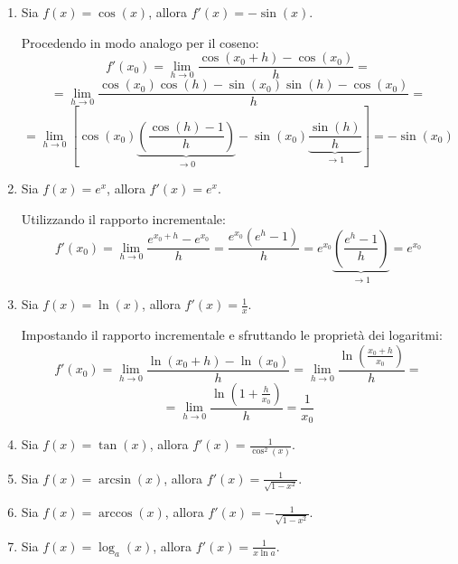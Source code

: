 \documentclass[12pt]{report}
\begin{document}
\begin{enumerate}
\begin{dimostrazione}{Derivata del seno}{}
		\end{dimostrazione}
		
		\item Sia $f(x) = \cos(x)$, allora $f'(x) = -\sin(x)$.
		\begin{dimostrazione}{}{}
			
			Procedendo in modo analogo per il coseno:
			\[
			f'(x_0) = \lim_{h \to 0} \frac{\cos(x_0 + h) - \cos(x_0)}{h} =
			\]
			\[
			= \lim_{h \to 0} \frac{\cos(x_0)\cos(h) - \sin(x_0)\sin(h) - \cos(x_0)}{h} =
			\]
			\[
			= \lim_{h \to 0} \left[ \cos(x_0) \underbrace{\left(\frac{\cos(h) - 1}{h}\right)}_{\to 0} - \sin(x_0) \underbrace{\frac{\sin(h)}{h}}_{\to 1} \right] = -\sin(x_0)
			\]
			
		\end{dimostrazione}
		
		\item Sia $f(x) = e^x$, allora $f'(x) = e^x$.
		\begin{dimostrazione}{}{}
			
			Utilizzando il rapporto incrementale:
			\[
			f'(x_0) = \lim_{h \to 0} \frac{e^{x_0 + h} - e^{x_0}}{h} = \frac{e^{x_0}(e^h - 1)}{h} = e^{x_0} \underbrace{\left(\frac{e^h - 1}{h}\right)}_{\to 1} = e^{x_0}
			\]
			
		\end{dimostrazione}
		
		\item Sia $f(x) = \ln(x)$, allora $f'(x) = \frac{1}{x}$.
		\begin{dimostrazione}{}{}
			
			Impostando il rapporto incrementale e sfruttando le proprietà dei logaritmi:
			\[
			f'(x_0) = \lim_{h \to 0} \frac{\ln(x_0 + h) - \ln(x_0)}{h} = \lim_{h \to 0} \frac{\ln\left(\frac{x_0 + h}{x_0}\right)}{h} =
			\]
			\[
			= \lim_{h \to 0} \frac{\ln\left(1 + \frac{h}{x_0}\right)}{h} = \frac{1}{x_0}
			\]
			
		\end{dimostrazione}
		
		\item Sia $f(x) = \tan(x)$, allora $f'(x) = \frac{1}{\cos^2(x)}$.
		
		\item Sia $f(x) = \arcsin(x)$, allora $f'(x) = \frac{1}{\sqrt{1 - x^2}}$.
		
		\item Sia $f(x) = \arccos(x)$, allora $f'(x) = -\frac{1}{\sqrt{1 - x^2}}$.
		
		\item Sia $f(x) = \log_a(x)$, allora $f'(x) = \frac{1}{x \ln a}$.
		
	\end{enumerate}
	
\end{document}
